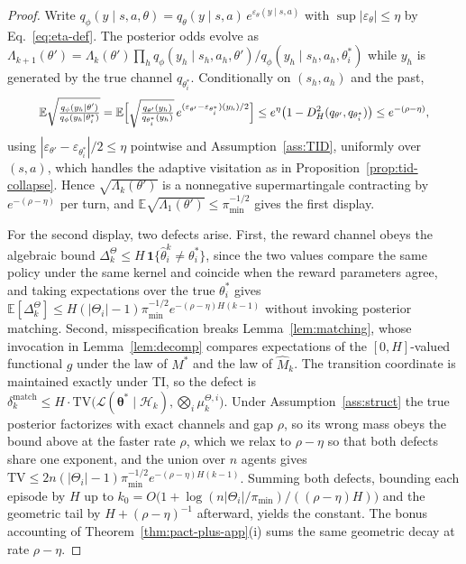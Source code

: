 \begin{proof}
Write $q_\phi(y\mid s,a,\theta)=q_{\theta}(y\mid s,a)\,e^{\varepsilon_\theta(y\mid s,a)}$ with $\sup|\varepsilon_\theta|\le\eta$ by Eq.~\eqref{eq:eta-def}. The posterior odds evolve as $\Lambda_{k+1}(\theta')=\Lambda_k(\theta')\prod_{h}q_\phi(y_h\mid s_h,a_h,\theta')/q_\phi(y_h\mid s_h,a_h,\theta_i^*)$ while $y_h$ is generated by the true channel $q_{\theta_i^*}$. Conditionally on $(s_h,a_h)$ and the past,
\begin{equation*}\resizebox{0.9\linewidth}{!}{$\displaystyle
\mathbb{E}\sqrt{\tfrac{q_\phi(y_h\mid\theta')}{q_\phi(y_h\mid\theta_i^*)}}
= \mathbb{E}\Big[\sqrt{\tfrac{q_{\theta'}(y_h)}{q_{\theta_i^*}(y_h)}}\,e^{(\varepsilon_{\theta'}-\varepsilon_{\theta_i^*})(y_h)/2}\Big]
\le e^{\eta}\big(1-D_H^2(q_{\theta'},q_{\theta_i^*})\big) \le e^{-(\rho-\eta)},
$}\end{equation*}
using $|\varepsilon_{\theta'}-\varepsilon_{\theta_i^*}|/2\le\eta$ pointwise and Assumption~\ref{ass:TID}, uniformly over $(s,a)$, which handles the adaptive visitation as in Proposition~\ref{prop:tid-collapse}. Hence $\sqrt{\Lambda_k(\theta')}$ is a nonnegative supermartingale contracting by $e^{-(\rho-\eta)}$ per turn, and $\mathbb{E}\sqrt{\Lambda_1(\theta')}\le\pi_{\min}^{-1/2}$ gives the first display.

For the second display, two defects arise. First, the reward channel obeys the algebraic bound $\Delta_k^\Theta\le H\,\mathbf 1\{\hat\theta_i^k\neq\theta_i^*\}$, since the two values compare the same policy under the same kernel and coincide when the reward parameters agree, and taking expectations over the true $\theta_i^*$ gives $\mathbb{E}[\Delta_k^\Theta]\le H(|\Theta_i|-1)\pi_{\min}^{-1/2}e^{-(\rho-\eta)H(k-1)}$ without invoking posterior matching. Second, misspecification breaks Lemma~\ref{lem:matching}, whose invocation in Lemma~\ref{lem:decomp} compares expectations of the $[0,H]$-valued functional $g$ under the law of $M^*$ and the law of $\hat M_k$. The transition coordinate is maintained exactly under TI, so the defect is $\delta_k^{\mathrm{match}}\le H\cdot\mathrm{TV}\big(\mathcal L(\boldsymbol\theta^*\mid\mathcal H_k),\bigotimes_i\mu_k^{\Theta,i}\big)$. Under Assumption~\ref{ass:struct} the true posterior factorizes with exact channels and gap $\rho$, so its wrong mass obeys the bound above at the faster rate $\rho$, which we relax to $\rho-\eta$ so that both defects share one exponent, and the union over $n$ agents gives $\mathrm{TV}\le 2n(|\Theta_i|-1)\pi_{\min}^{-1/2}e^{-(\rho-\eta)H(k-1)}$. Summing both defects, bounding each episode by $H$ up to $k_0=O\big(1+\log(n|\Theta_i|/\pi_{\min})/((\rho-\eta)H)\big)$ and the geometric tail by $H+(\rho-\eta)^{-1}$ afterward, yields the constant. The bonus accounting of Theorem~\ref{thm:pact-plus-app}(i) sums the same geometric decay at rate $\rho-\eta$.
\end{proof}

